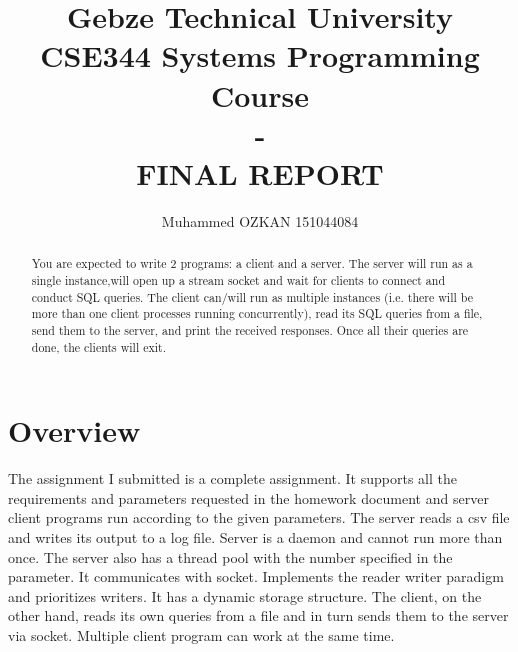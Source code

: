 \documentclass{article}
\begin{document}
\title{Gebze Technical University\\CSE344 Systems Programming Course\\ -\\FINAL REPORT}
\author{Muhammed OZKAN 151044084}

\maketitle

\begin{abstract}
You are expected to write 2 programs: a client and a server. The server will run as a single instance,will open up a stream socket and wait for clients to connect and conduct SQL queries. The client
can/will run as multiple instances (i.e. there will be more than one client processes running concurrently), read its SQL queries from a file, send them to the server, and print the received responses. Once all their queries are done, the clients will exit.

\end{abstract}

\section{Overview}
\quad The assignment I submitted is a complete assignment. It supports all the requirements and parameters requested in the homework document and server client programs run according to the given parameters. The server reads a csv file and writes its output to a log file. Server is a daemon and cannot run more than once. The server also has a thread pool with the number specified in the parameter. It communicates with socket. Implements the reader writer paradigm and prioritizes writers. It has a dynamic storage structure. The client, on the other hand, reads its own queries from a file and in turn sends them to the server via socket. Multiple client program can work at the same time.
\\
\newpage
\end{document}

